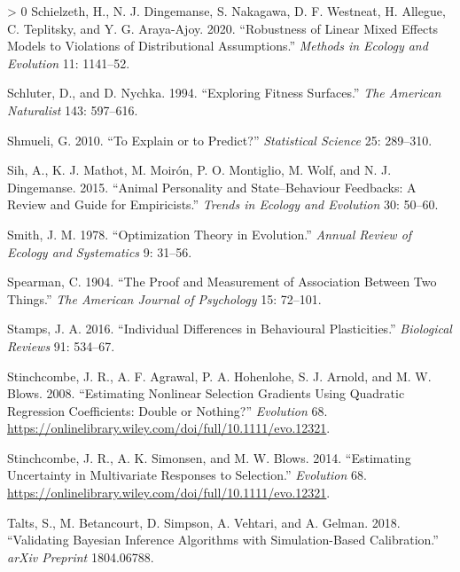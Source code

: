 \documentclass{article}
\newlength{\cslhangindent}
\newenvironment{CSLReferences}[3] %
 {%
  \setlength{\parindent}{0pt}
  \ifodd #1 \everypar{\setlength{\hangindent}{\cslhangindent}}\ignorespaces\fi
  \ifnum #2 > 0
  \setlength{\parskip}{#2\baselineskip}
  \fi
 }%
 {}
\begin{document}
\begin{CSLReferences}{1}{0}
\leavevmode\hypertarget{ref-Schiel2020}{}%
Schielzeth, H., N. J. Dingemanse, S. Nakagawa, D. F. Westneat, H.
Allegue, C. Teplitsky, and Y. G. Araya-Ajoy. 2020. {``Robustness of
Linear Mixed Effects Models to Violations of Distributional
Assumptions.''} \emph{Methods in Ecology and Evolution} 11: 1141--52.

\leavevmode\hypertarget{ref-Schluter1994}{}%
Schluter, D., and D. Nychka. 1994. {``Exploring Fitness Surfaces.''}
\emph{The American Naturalist} 143: 597--616.

\leavevmode\hypertarget{ref-Shmueli2010}{}%
Shmueli, G. 2010. {``To Explain or to Predict?''} \emph{Statistical
Science} 25: 289--310.

\leavevmode\hypertarget{ref-Sih2015}{}%
Sih, A., K. J. Mathot, M. Moirón, P. O. Montiglio, M. Wolf, and N. J.
Dingemanse. 2015. {``Animal Personality and State--Behaviour Feedbacks:
A Review and Guide for Empiricists.''} \emph{Trends in Ecology and
Evolution} 30: 50--60.

\leavevmode\hypertarget{ref-Smith1978}{}%
Smith, J. M. 1978. {``Optimization Theory in Evolution.''} \emph{Annual
Review of Ecology and Systematics} 9: 31--56.

\leavevmode\hypertarget{ref-Spearman1904}{}%
Spearman, C. 1904. {``The Proof and Measurement of Association Between
Two Things.''} \emph{The American Journal of Psychology} 15: 72--101.

\leavevmode\hypertarget{ref-Stamps2016}{}%
Stamps, J. A. 2016. {``Individual Differences in Behavioural
Plasticities.''} \emph{Biological Reviews} 91: 534--67.

\leavevmode\hypertarget{ref-Stinch2008}{}%
Stinchcombe, J. R., A. F. Agrawal, P. A. Hohenlohe, S. J. Arnold, and M.
W. Blows. 2008. {``Estimating Nonlinear Selection Gradients Using
Quadratic Regression Coefficients: Double or Nothing?''}
\emph{Evolution} 68.
\url{https://onlinelibrary.wiley.com/doi/full/10.1111/evo.12321}.

\leavevmode\hypertarget{ref-Stinch2014}{}%
Stinchcombe, J. R., A. K. Simonsen, and M. W. Blows. 2014. {``Estimating
Uncertainty in Multivariate Responses to Selection.''} \emph{Evolution}
68. \url{https://onlinelibrary.wiley.com/doi/full/10.1111/evo.12321}.

\leavevmode\hypertarget{ref-Talts2018}{}%
Talts, S., M. Betancourt, D. Simpson, A. Vehtari, and A. Gelman. 2018.
{``Validating Bayesian Inference Algorithms with Simulation-Based
Calibration.''} \emph{arXiv Preprint} 1804.06788.


\end{CSLReferences}
\end{document}
